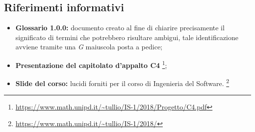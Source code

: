 \subsection{Riferimenti informativi}
\begin{itemize}
	
	\item \textbf{Glossario 1.0.0:} documento creato al fine di chiarire precisamente il significato di termini che potrebbero risultare ambigui, tale identificazione avviene tramite una \textit{G} maiuscola posta a pedice; 
	\item \textbf{Presentazione del capitolato d'appalto C4} \footnote{\url{https://www.math.unipd.it/~tullio/IS-1/2018/Progetto/C4.pdf}};
	\item \textbf{Slide del corso:} lucidi forniti per il corso di Ingenieria del Software. \footnote{\url{https://www.math.unipd.it/~tullio/IS-1/2018/}}
\end{itemize}

